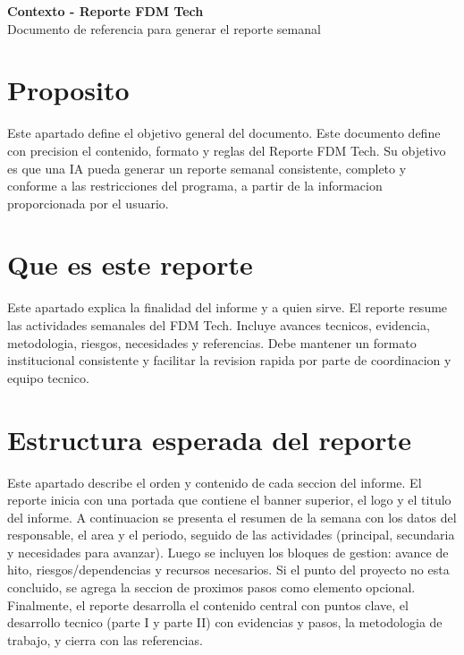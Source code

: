 \documentclass[11pt,a4paper]{article}
\begin{document}
\begin{center}
  {\LARGE \textbf{Contexto - Reporte FDM Tech}}\\
  \vspace{2mm}
  {\large Documento de referencia para generar el reporte semanal}
\end{center}

\section{Proposito}
Este apartado define el objetivo general del documento. Este documento define
con precision el contenido, formato y reglas del Reporte FDM Tech.
Su objetivo es que una IA pueda generar un reporte semanal consistente,
completo y conforme a las restricciones del programa, a partir de la
informacion proporcionada por el usuario.

\section{Que es este reporte}
Este apartado explica la finalidad del informe y a quien sirve. El reporte
resume las actividades semanales del FDM Tech. Incluye
avances tecnicos, evidencia, metodologia, riesgos, necesidades y referencias.
Debe mantener un formato institucional consistente y facilitar la revision
rapida por parte de coordinacion y equipo tecnico.

\section{Estructura esperada del reporte}
Este apartado describe el orden y contenido de cada seccion del informe. El
reporte inicia con una portada que contiene el banner superior, el logo y el
titulo del informe. A continuacion se presenta el resumen de la semana con los
datos del responsable, el area y el periodo, seguido de las actividades
(principal, secundaria y necesidades para avanzar). Luego se incluyen los
bloques de gestion: avance de hito, riesgos/dependencias y recursos necesarios.
Si el punto del proyecto no esta concluido, se agrega la seccion de proximos
pasos como elemento opcional. Finalmente, el reporte desarrolla el contenido
central con puntos clave, el desarrollo tecnico (parte I y parte II) con
evidencias y pasos, la metodologia de trabajo, y cierra con las referencias.
\end{document}
